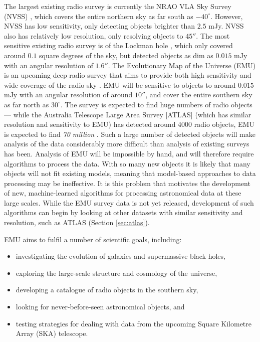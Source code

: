             The largest existing radio survey is currently the NRAO VLA Sky
            Survey (NVSS) \citep{condon98}, which covers the entire northern sky
            as far south as $-40^\circ$. However, NVSS has low sensitivity, only
            detecting objects brighter than $2.5$ mJy. NVSS also has relatively
            low resolution, only resolving objects to $45''$. The most sensitive
            existing radio survey is of the Lockman hole \citep{owen08}, which
            only covered around $0.1$ square degrees of the sky, but detected
            objects as dim as $0.015$ mJy with an angular resolution of $1.6''$.
            The Evolutionary Map of the Universe (EMU) is an upcoming deep radio
            survey that aims to provide both high sensitivity and wide coverage
            of the radio sky \citep{norris11}. EMU will be sensitive to objects
            to around $0.015$ mJy with an angular resolution of around $10''$,
            and cover the entire southern sky as far north as $30^\circ$. The
            survey is expected to find huge numbers of radio objects --- while
            the Australia Telescope Large Area Survey [ATLAS] (which has similar
            resolution and sensitivity to EMU) has detected around 4000 radio
            objects, EMU is expected to find \emph{70 million}
            \citep{banfield15}. Such a large number of detected objects will
            make analysis of the data considerably more difficult than analysis
            of existing surveys has been. Analysis of EMU will be impossible by
            hand, and will therefore require algorithms to process the data.
            With so many new objects it is likely that many objects will not fit
            existing models, meaning that model-based approaches to data
            processing may be ineffective. It is this problem that motivates the
            development of new, machine-learned algorithms for processing
            astronomical data at these large scales. While the EMU survey data
            is not yet released, development of such algorithms can begin by
            looking at other datasets with similar sensitivity and resolution,
            such as ATLAS (Section \ref{sec:atlas}).

            EMU aims to fulfil a number of scientific goals, including:
            \begin{itemize}
                \setlength\itemsep{0 pt}
                \item investigating the evolution of galaxies and supermassive
                    black holes,
                \item exploring the large-scale structure and cosmology of the
                    universe,
                \item developing a catalogue of radio objects in the southern
                    sky,
                \item looking for never-before-seen astronomical objects, and
                \item testing strategies for dealing with data from the upcoming
                    Square Kilometre Array (SKA) telescope.
            \end{itemize}

